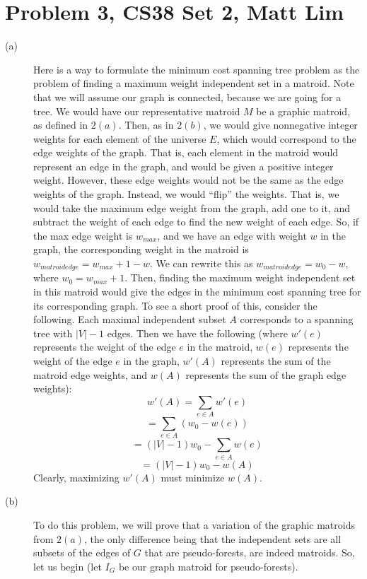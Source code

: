 \documentclass{article}
\begin{document}
\section*{Problem 3, CS38 Set 2, Matt Lim}
\begin{description}
    \item[(a)]
        Here is a way to formulate the minimum cost spanning tree problem as the
        problem of finding a maximum weight independent set in a matroid. Note
        that we will assume our graph is connected, because we are going for a
        tree. We
        would have our representative matroid $M$ be a graphic matroid, as
        defined in $2(a)$. Then, as in $2(b)$, we would give nonnegative integer
        weights for each element of the universe $E$, which would correspond to the
        edge weights of the graph. That is, each element in the matroid would
        represent an edge in the graph, and would be given a positive integer weight.
        However, these edge weights would not be the
        same as the edge weights of the graph. Instead, we would ``flip'' the
        weights. That is, we would take the maximum edge weight from the graph,
        add one to it,
        and subtract the weight of each edge to find the new weight of each
        edge. So, if the max edge weight is $w_{max}$, and we have an edge with
        weight $w$ in the graph, the corresponding weight in the matroid is $w_{matroid edge} =
        w_{max} + 1 - w$. We can rewrite this as $w_{matroid edge} = w_0 - w$, where
        $w_0 = w_{max} + 1$.
        Then, finding the maximum weight independent set in this
        matroid would give the edges in the minimum cost spanning tree for its
        corresponding graph. To see a short proof of this, consider the
        following. Each maximal independent subset $A$ corresponds to a spanning
        tree with $|V| - 1$ edges. Then we have the following (where $w'(e)$
        represents the weight of the edge $e$ in the matroid, $w(e)$ represents the
        weight of the edge $e$ in the graph, $w'(A)$ represents the sum of the
        matroid edge weights, and $w(A)$ represents the sum of the graph edge
        weights):
        \[ w'(A) = \sum_{e \in A} w'(e) \]
        \[ = \sum_{e \in A} (w_0 - w(e)) \]
        \[ = (|V| - 1)w_0 - \sum_{e \in A} w(e) \]
        \[ = (|V| - 1)w_0 - w(A) \]
        Clearly, maximizing $w'(A)$ must minimize $w(A)$.
    \item[(b)]
        To do this problem, we will prove that a variation of the graphic
        matroids from $2(a)$, the only difference being that the independent
        sets are all subsets of the edges of $G$ that are pseudo-forests, are
        indeed matroids. So, let us begin (let $I_G$ be our graph matroid for
        pseudo-forests).


\end{description}
\end{document}
